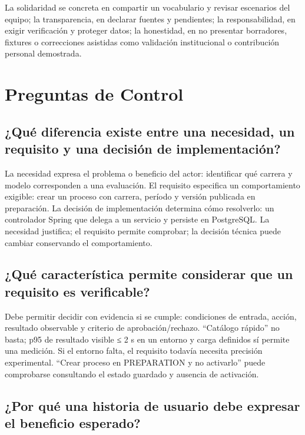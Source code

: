 \documentclass[11pt,a4paper]{article}
\begin{document}
La solidaridad se concreta en compartir un vocabulario y revisar
escenarios del equipo; la transparencia, en declarar fuentes y
pendientes; la responsabilidad, en exigir verificación y proteger datos;
la honestidad, en no presentar borradores, fixtures o correcciones
asistidas como validación institucional o contribución personal
demostrada.

\section{Preguntas de Control}\label{preguntas-de-control}

\subsection{¿Qué diferencia existe entre una necesidad, un requisito y
una decisión de
implementación?}\label{quuxe9-diferencia-existe-entre-una-necesidad-un-requisito-y-una-decisiuxf3n-de-implementaciuxf3n}

La necesidad expresa el problema o beneficio del actor: identificar qué
carrera y modelo corresponden a una evaluación. El requisito especifica
un comportamiento exigible: crear un proceso con carrera, período y
versión publicada en preparación. La decisión de implementación
determina cómo resolverlo: un controlador Spring que delega a un
servicio y persiste en PostgreSQL. La necesidad justifica; el requisito
permite comprobar; la decisión técnica puede cambiar conservando el
comportamiento.

\subsection{¿Qué característica permite considerar que un requisito es
verificable?}\label{quuxe9-caracteruxedstica-permite-considerar-que-un-requisito-es-verificable}

Debe permitir decidir con evidencia si se cumple: condiciones de
entrada, acción, resultado observable y criterio de aprobación/rechazo.
``Catálogo rápido'' no basta; p95 de resultado visible ≤ 2 s en un
entorno y carga definidos sí permite una medición. Si el entorno falta,
el requisito todavía necesita precisión experimental. ``Crear proceso en
PREPARATION y no activarlo'' puede comprobarse consultando el estado
guardado y ausencia de activación.

\subsection{¿Por qué una historia de usuario debe expresar el beneficio
esperado?}\label{por-quuxe9-una-historia-de-usuario-debe-expresar-el-beneficio-esperado}
\end{document}
